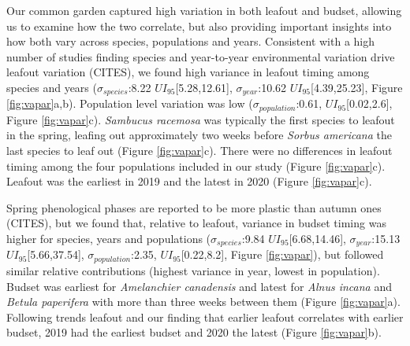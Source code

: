 \documentclass{article}[12pt]
\begin{document}
Our common garden captured high variation in both leafout and budset, allowing us to examine how the two correlate, but also providing important insights into how both vary across species, populations and years. Consistent with a high number of studies finding species and year-to-year environmental variation drive leafout variation (CITES), we found high variance in leafout timing among species and years ($\sigma_{species}$:8.22 $UI_{95}$[5.28,12.61], $\sigma_{year}$:10.62 $UI_{95}$[4.39,25.23], Figure \ref{fig:vapar}a,b). Population level variation was low ($\sigma_{population}$:0.61, $UI_{95}$[0.02,2.6], Figure \ref{fig:vapar}c). \emph{Sambucus racemosa} was typically the first species to leafout in the spring, leafing out approximately two weeks before \emph{Sorbus americana} the last species to leaf out (Figure \ref{fig:vapar}c). There were no differences in leafout timing among the four populations included in our study (Figure \ref{fig:vapar}c). Leafout was the earliest in 2019 and the latest in 2020 (Figure \ref{fig:vapar}c). %

Spring phenological phases are reported to be more plastic than autumn ones (CITES), but we found that, relative to leafout, variance in budset timing was higher for species, years and populations ($\sigma_{species}$:9.84 $UI_{95}$[6.68,14.46], $\sigma_{year}$:15.13 $UI_{95}$[5.66,37.54], $\sigma_{population}$:2.35, $UI_{95}$[0.22,8.2], Figure \ref{fig:vapar}), but followed similar relative contributions (highest variance in year, lowest in population). Budset was earliest for \emph{Amelanchier canadensis} and latest for \emph{Alnus incana} and \emph{Betula paperifera} with more than three weeks between them (Figure \ref{fig:vapar}a). Following trends leafout and our finding that earlier leafout correlates with earlier budset, 2019 had the earliest budset and 2020 the latest (Figure \ref{fig:vapar}b).
\end{document}
